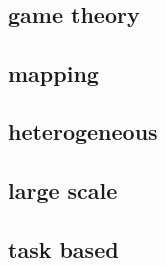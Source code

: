 \documentclass{article}
\begin{document}
\cite{Diamond:2017:DLB:3148226.3148236}\\
\cite{HORTON1993209}\\

\cite{Deng:2010:HDB:1889863.1889910}\\
\cite{Lieber:2016:PDL:2966884.2966887}\\

\cite{ROTARU2004481}\\
\cite{ParabolicLB}\\
\cite{CYBENKO1989279}\\
\cite{10.2307/2584287}\\
\cite{Boillat:1990:LBP:95324.95326}\\
\cite{XU199572}


\subsection{game theory}

\cite{GROSU20051022}
\cite{doi:10.1142/S0219198902000574}
\cite{7967109}


\subsection{mapping}

\cite{doi:10.1137/0611030}
\cite{4227986}
\cite{doi:10.1142/S0129054197000215}
\cite{Sbirlea:2014:BMS:2628071.2628090}

\subsection{heterogeneous}

\cite{Flegar:2017:OLI:3149704.3149767}
\cite{8082085}
\cite{7993387}
\cite{Cederman:2008:DLB:1413957.1413967}
\cite{10.1007/978-981-10-6442-5_56}
\cite{dlbgraphgpu}




\subsection{large scale}

\cite{PEARCE2017}
\cite{BERLINSKA201814}
\cite{8017633}
\cite{DEVINE2005133}
\cite{javataskpool}
\cite{barat:tel-01672546}



\subsection{task based}
\end{document}
